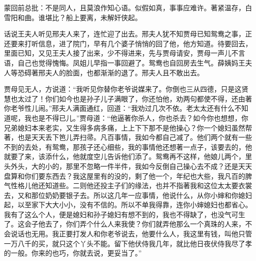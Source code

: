 \begin{parag}
    \begin{note}蒙回前总批：不是同人，且莫浪作知心语。似假如真，事事应难许。著紧温存，白雪阳和曲。谁堪比？船上要离，未解奸侠起。\end{note}
\end{parag}


\begin{parag}
    话说王夫人听见邢夫人来了，连忙迎了出去。邢夫人犹不知贾母已知鸳鸯之事，正还要来打听信息，进了院门，早有几个婆子悄悄的回了他，他方知道。待要回去，里面已知，又见王夫人接了出来，少不得进来，先与贾母请安，贾母一声儿不言语，自己也觉得愧悔。凤姐儿早指一事回避了。鸳鸯也自回房去生气。薛姨妈王夫人等恐碍著邢夫人的脸面，也都渐渐的退了。邢夫人且不敢出去。
\end{parag}


\begin{parag}
    贾母见无人，方说道：“我听见你替你老爷说媒来了。你倒也三从四德，只是这贤慧也太过了！你们如今也是孙子儿子满眼了，你还怕他，劝两句都使不得，还由著你老爷性儿闹。”邢夫人满面通红，回道：“我劝过几次不依。老太太还有什么不知道呢，我也是不得已儿。”贾母道：“他逼著你杀人，你也杀去？如今你也想想，你兄弟媳妇本来老实，又生得多病多痛，上上下下那不是他操心？你一个媳妇虽然帮著，也是天天丢下笆儿弄扫帚。凡百事情，我如今都自己减了。他们两个就有一些不到的去处，有鸳鸯，那孩子还心细些，我的事情他还想著一点子，该要去的，他就要了来，该添什么，他就度空儿告诉他们添了。鸳鸯再不这样，他娘儿两个，里头外头，大的小的，那里不忽略一件半件，我如今反倒自己操心去不成？还是天天盘算和你们要东西去？我这屋里有的没的，剩了他一个，年纪也大些，我凡百的脾气性格儿他还知道些。二则他还投主子们的缘法，也并不指著我和这位太太要衣裳去，又和那位奶奶要银子去。所以这几年一应事情，他说什么，从你小婶和你媳妇起，以至家下大大小小，没有不信的。所以不单我得靠，连你小婶媳妇也都省心。我有了这么个人，便是媳妇和孙子媳妇有想不到的，我也不得缺了，也没气可生了。这会子他去了，你们弄个什么人来我使？你们就弄他那么一个真珠的人来，不会说话也无用。我正要打发人和你老爷说去，他要什么人，我这里有钱，叫他只管一万八千的买，就只这个丫头不能。留下他伏侍我几年，就比他日夜伏侍我尽了孝的一般。你来的也巧，你就去说，更妥当了。”
\end{parag}


